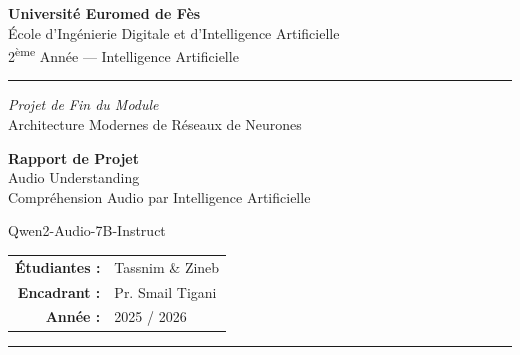\documentclass[12pt,a4paper]{report}
\begin{document}

\begin{titlepage}
  \centering
  \vspace*{1.5cm}

  {\Large\bfseries Université Euromed de Fès}\\[0.4em]
  {\large École d'Ingénierie Digitale et d'Intelligence Artificielle}\\[0.2em]
  {\normalsize 2\textsuperscript{ème} Année --- Intelligence Artificielle}

  \vspace{1cm}
  \rule{\linewidth}{1pt}
  \vspace{0.5cm}

  {\small\itshape Projet de Fin du Module}\\[0.3em]
  {\normalsize Architecture Modernes de Réseaux de Neurones}

  \vspace{1.5cm}

  {\Huge\bfseries\color{accentdark} Rapport de Projet}\\[0.6em]
  {\LARGE Audio Understanding}\\[0.4em]
  {\large Compréhension Audio par Intelligence Artificielle}

  \vspace{1cm}
  \begin{tcolorbox}[
    enhanced, colback=white, colframe=accent,
    width=0.65\linewidth, arc=4pt,
    halign=center
  ]
    \centering\ttfamily\large Qwen2-Audio-7B-Instruct
  \end{tcolorbox}

  \vspace{2cm}

  \begin{tabular}{rl}
    \textbf{Étudiantes :}  & Tassnim \& Zineb \\[0.3em]
    \textbf{Encadrant :}   & Pr. Smail Tigani \\[0.3em]
    \textbf{Année :}       & 2025 / 2026 \\
  \end{tabular}

  \vfill
  \rule{\linewidth}{0.5pt}
\end{titlepage}

\tableofcontents
\newpage
\end{document}
